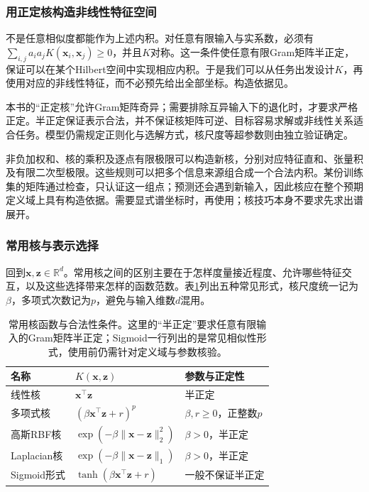 \subsubsection{用正定核构造非线性特征空间}
\label{sec:classic-overview-kernel-validity}
\label{sec:classification-svm-mercer}

不是任意相似度都能作为上述内积。对任意有限输入与实系数，必须有$\sum_{i,j}a_i a_jK(\bm x_i,\bm x_j)\geq0$，并且$K$对称。这一条件使任意有限Gram矩阵半正定，保证可以在某个Hilbert空间中实现相应内积。于是我们可以从任务出发设计$K$，再使用对应的非线性特征，而不必预先给出全部坐标。构造依据见。

本书的“正定核”允许Gram矩阵奇异；需要排除互异输入下的退化时，才要求严格正定。半正定保证表示合法，并不保证核矩阵可逆、目标容易求解或非线性关系适合任务。模型仍需规定正则化与选解方式，核尺度等超参数则由独立验证确定。

非负加权和、核的乘积及逐点有限极限可以构造新核，分别对应特征直和、张量积及有限二次型极限。这些规则可以把多个信息来源组合成一个合法内积。某份训练集的矩阵通过检查，只认证这一组点；预测还会遇到新输入，因此核应在整个预期定义域上具有构造依据。需要显式谱坐标时，再使用；核技巧本身不要求先求出谱展开。

\subsubsection{常用核与表示选择}
\label{sec:classic-overview-common-kernels}
\label{sec:classification-svm-common-kernels}

回到$\bm{x},\bm{z}\in\mathbb{R}^d$。常用核之间的区别主要在于怎样度量接近程度、允许哪些特征交互，以及这些选择带来怎样的函数范数。表\ref{tab:classification-svm-kernels}列出五种常见形式，核尺度统一记为$\beta$，多项式次数记为$p$，避免与输入维数$d$混用。

\begin{table}[htbp]
  \centering
  \small
  \begin{tabularx}{\linewidth}{@{}>{\RaggedRight\arraybackslash}p{18mm}>{\RaggedRight\arraybackslash}X>{\RaggedRight\arraybackslash}p{27mm}@{}}
    \toprule
    名称 & $K(\bm{x},\bm{z})$ & 参数与正定性\\
    \midrule
    线性核 & $\bm{x}^{\top}\bm{z}$ & 半正定\\
    多项式核 & $(\beta\bm{x}^{\top}\bm{z}+r)^p$ & $\beta,r\ge0$，正整数$p$\\
    高斯RBF核 & $\exp(-\beta\lVert\bm{x}-\bm{z}\rVert_2^2)$ & $\beta>0$，半正定\\
    Laplacian核 & $\exp(-\beta\lVert\bm{x}-\bm{z}\rVert_1)$ & $\beta>0$，半正定\\
    Sigmoid形式 & $\tanh(\beta\bm{x}^{\top}\bm{z}+r)$ & 一般不保证半正定\\
    \bottomrule
  \end{tabularx}
  \caption{常用核函数与合法性条件。这里的“半正定”要求任意有限输入的Gram矩阵半正定；Sigmoid一行列出的是常见相似性形式，使用前仍需针对定义域与参数核验。}
  \label{tab:classification-svm-kernels}
\end{table}

